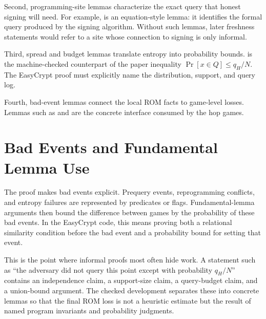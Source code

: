 Second, programming-site lemmas characterize the exact query that honest
signing will need.  For example,
 is an equation-style lemma:
it identifies the formal query produced by the signing algorithm.  Without such
lemmas, later freshness statements would refer to a site whose connection to
signing is only informal.

Third, spread and budget lemmas translate entropy into probability bounds.
 is the
machine-checked counterpart of the paper inequality \(\Pr[x\in Q]\le q_H/N\).
The EasyCrypt proof must explicitly name the distribution, support, and query
log.

Fourth, bad-event lemmas connect the local ROM facts to game-level losses.
Lemmas such as
 and
are the concrete interface consumed by the hop games.

\section{Bad Events and Fundamental Lemma Use}

The proof makes bad events explicit.  Prequery events, reprogramming conflicts,
and entropy failures are represented by predicates or flags.  Fundamental-lemma
arguments then bound the difference between games by the probability of these
bad events.  In the EasyCrypt code, this means proving both a relational
similarity condition before the bad event and a probability bound for setting
that event.

This is the point where informal proofs most often hide work.  A statement such
as ``the adversary did not query this point except with probability \(q_H/N\)''
contains an independence claim, a support-size claim, a query-budget claim, and
a union-bound argument.  The checked development separates these into concrete
lemmas so that the final ROM loss is not a heuristic estimate but the result of
named program invariants and probability judgments.
